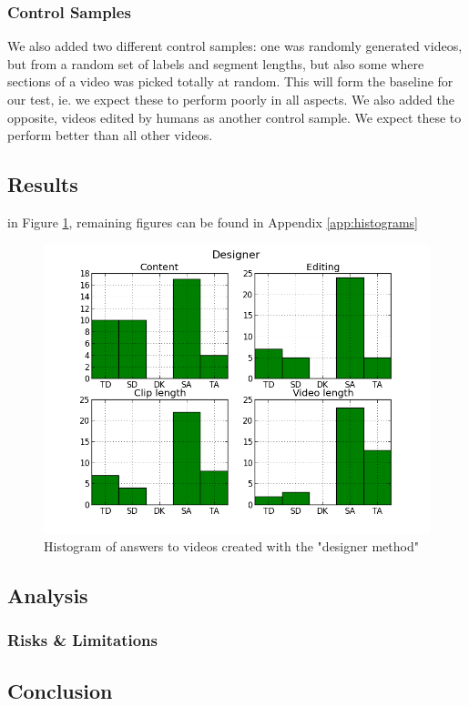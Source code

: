 \subsubsection{Control Samples}
%
We also added two different control samples: one was randomly generated videos, but from a random set of labels and segment lengths, but also some where sections of a video was picked totally at random.
%
%
This will form the baseline for our test, ie. we expect these to perform poorly in all aspects. We also added the opposite, videos edited by humans as another control sample. We expect these to perform better than all other videos.
%
\subsection{Results}
%
in Figure \ref{fig:hist_design}, remaining figures can be found in Appendix \ref{app:histograms}
%
\begin{figure}
     \centering
     \includegraphics[width=1.0\textwidth]{img/designer_barplot.png}
     \caption{Histogram of answers to videos created with the "designer method"}\label{fig:hist_design}
\end{figure}
%
%
\subsection{Analysis}
%

%
\subsubsection{Risks \& Limitations}
%


%
\subsection{Conclusion}
%